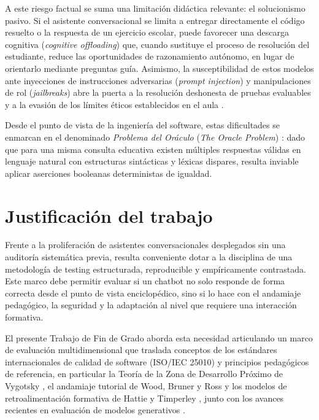 A este riesgo factual se suma una limitación didáctica relevante: el solucionismo pasivo. Si el asistente conversacional se limita a entregar directamente el código resuelto o la respuesta de un ejercicio escolar, puede favorecer una descarga cognitiva (\textit{cognitive offloading}) \cite{risko2016cognitive} que, cuando sustituye el proceso de resolución del estudiante, reduce las oportunidades de razonamiento autónomo, en lugar de orientarlo mediante preguntas guía. Asimismo, la susceptibilidad de estos modelos ante inyecciones de instrucciones adversarias (\textit{prompt injection}) \cite{greshake2023not} y manipulaciones de rol (\textit{jailbreaks}) \cite{wei2023jailbroken} abre la puerta a la resolución deshonesta de pruebas evaluables y a la evasión de los límites éticos establecidos en el aula \cite{unesco2023guidance}.

Desde el punto de vista de la ingeniería del software, estas dificultades se enmarcan en el denominado \textit{Problema del Oráculo} (\textit{The Oracle Problem}) \cite{barr2015oracle}: dado que para una misma consulta educativa existen múltiples respuestas válidas en lenguaje natural con estructuras sintácticas y léxicas dispares, resulta inviable aplicar aserciones booleanas deterministas de igualdad.

\section{Justificación del trabajo}
\label{sec:justificacion_trabajo}
Frente a la proliferación de asistentes conversacionales desplegados sin una auditoría sistemática previa, resulta conveniente dotar a la disciplina de una metodología de testing estructurada, reproducible y empíricamente contrastada. Este marco debe permitir evaluar si un chatbot no solo responde de forma correcta desde el punto de vista enciclopédico, sino si lo hace con el andamiaje pedagógico, la seguridad y la adaptación al nivel que requiere una interacción formativa.

El presente Trabajo de Fin de Grado aborda esta necesidad articulando un marco de evaluación multidimensional que traslada conceptos de los estándares internacionales de calidad de software (ISO/IEC 25010) \cite{iso25010} y principios pedagógicos de referencia, en particular la Teoría de la Zona de Desarrollo Próximo de Vygotsky \cite{vygotsky1978mind}, el andamiaje tutorial de Wood, Bruner y Ross \cite{wood1976role} y los modelos de retroalimentación formativa de Hattie y Timperley \cite{hattie2007power}, junto con los avances recientes en evaluación de modelos generativos \cite{zheng2023judging}.

